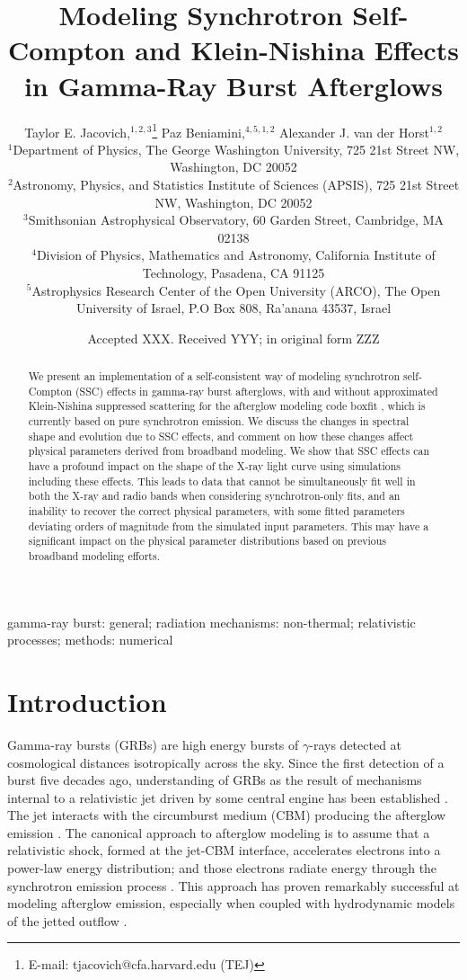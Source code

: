 \documentclass[fleqn,usenatbib]{mnras}
\title[Modeling SSC and KN Effects in GRB Afterglows]{Modeling Synchrotron Self-Compton and Klein-Nishina Effects in Gamma-Ray Burst Afterglows}
\author[Jacovich, Beniamini, \& van der Horst]{
Taylor E. Jacovich,$^{1,2,3}$\thanks{E-mail: tjacovich@cfa.harvard.edu (TEJ)}
Paz Beniamini,$^{4,5,1,2}$
Alexander J. van der Horst$^{1,2}$
\\
$^{1}$Department of Physics, The George Washington University, 725 21st Street NW, Washington, DC 20052\\
$^{2}$Astronomy, Physics, and Statistics Institute of Sciences (APSIS), 725 21st Street NW, Washington, DC 20052\\
$^{3}$Smithsonian Astrophysical Observatory, 60 Garden Street, Cambridge, MA 02138\\
$^{4}$Division of Physics, Mathematics and Astronomy, California Institute of Technology, Pasadena, CA 91125\\
$^{5}$Astrophysics Research Center of the Open University (ARCO), The Open University of Israel, P.O Box 808, Ra’anana 43537, Israel}
\date{Accepted XXX. Received YYY; in original form ZZZ}
\begin{document}
\label{firstpage}
\pagerange{\pageref{firstpage}--\pageref{lastpage}}
\maketitle

\begin{abstract}
We present an implementation of a self-consistent way of modeling synchrotron self-Compton (SSC) effects in gamma-ray burst afterglows, with and without approximated Klein-Nishina suppressed scattering for the afterglow modeling code boxfit%
, which is currently based on pure synchrotron emission.  We discuss the changes in spectral shape and evolution due to SSC effects, and comment on how these changes affect physical parameters derived from broadband modeling. We show that SSC effects can have a profound impact on the shape of the X-ray light curve using simulations including these effects. This leads to data that cannot be simultaneously fit well in both the X-ray and radio bands when considering synchrotron-only fits, and an inability to recover the correct physical parameters, with some fitted parameters deviating orders of magnitude from the simulated input parameters. This may have a significant impact on the physical parameter distributions based on previous broadband modeling efforts.
\end{abstract}

\begin{keywords}
gamma-ray burst: general; radiation mechanisms: non-thermal; relativistic processes; methods: numerical
\end{keywords}



\section{Introduction}

Gamma-ray bursts (GRBs) are high energy bursts of $\gamma$-rays detected at cosmological distances isotropically across the sky. Since the first detection of a burst five decades ago, understanding of GRBs as the result of mechanisms internal to a relativistic jet driven by some central engine has been established \citep{RM92}. The jet interacts with the circumburst medium (CBM) producing the afterglow emission \citep{wrm97}. The canonical approach to afterglow modeling is to assume that a relativistic shock, formed at the jet-CBM interface, accelerates electrons into a power-law energy distribution; and those electrons radiate energy through the synchrotron emission process \citep{AG1,WG99}. This approach has proven remarkably successful at modeling afterglow emission, especially when coupled with hydrodynamic models of the jetted outflow \citep[e.g.][]{R99, CL99,PK02, AG2, vetajvdh}.
\end{document}
